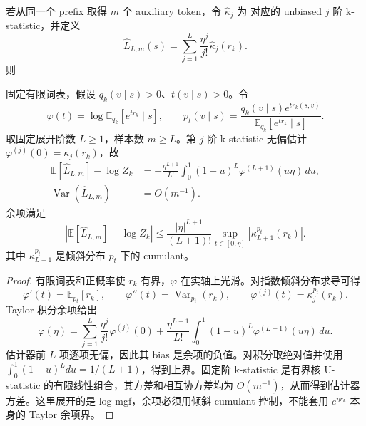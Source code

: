 若从同一个 prefix 取得 $m$ 个 auxiliary token，令 $\widehat\kappa_j$ 为 对应的 unbiased $j$ 阶 k-statistic，并定义
\begin{equation}
\widehat L_{L,m}(s)=\sum_{j=1}^{L}\frac{\eta^j}{j!}\widehat\kappa_j(r_k).
\label{eq:ch2-opd-logz-kstat-estimator}
\end{equation}
则
\begin{theorem}
\label{thm:ch2-opd-logz-cumulant}
固定有限词表，假设 $q_k(v\mid s)>0$、$t(v\mid s)>0$。令
\begin{equation}
\varphi(t)=\log\mathbb E_{q_k}[e^{t r_k}\mid s],\qquad
p_t(v\mid s)=\frac{q_k(v\mid s)e^{t r_k(s,v)}}{\mathbb E_{q_k}[e^{t r_k}\mid s]}.
\end{equation}
取固定展开阶数 $L\ge1$，样本数 $m\ge L$。第 $j$ 阶 k-statistic 无偏估计 $\varphi^{(j)}(0)=\kappa_j(r_k)$，故
\begin{align}
\mathbb E[\widehat L_{L,m}]-\log Z_k
&=-\frac{\eta^{L+1}}{L!}\int_0^1(1-u)^L\varphi^{(L+1)}(u\eta)\,du,\\
\operatorname{Var}(\widehat L_{L,m})&=O(m^{-1}).
\end{align}
余项满足
\begin{equation}
\left|\mathbb E[\widehat L_{L,m}]-\log Z_k\right|
\le\frac{|\eta|^{L+1}}{(L+1)!}\sup_{t\in[0,\eta]}\left|\kappa_{L+1}^{p_t}(r_k)\right|.
\end{equation}
其中 $\kappa_{L+1}^{p_t}$ 是倾斜分布 $p_t$ 下的 cumulant。
\end{theorem}
\begin{proof}
有限词表和正概率使 $r_k$ 有界，$\varphi$ 在实轴上光滑。对指数倾斜分布求导可得
\begin{equation}
\varphi'(t)=\mathbb E_{p_t}[r_k],\qquad
\varphi''(t)=\operatorname{Var}_{p_t}(r_k),\qquad
\varphi^{(j)}(t)=\kappa_j^{p_t}(r_k).
\end{equation}
Taylor 积分余项给出
\begin{equation}
\varphi(\eta)=\sum_{j=1}^{L}\frac{\eta^j}{j!}\varphi^{(j)}(0)
+\frac{\eta^{L+1}}{L!}\int_0^1(1-u)^L\varphi^{(L+1)}(u\eta)\,du.
\end{equation}
估计器前 $L$ 项逐项无偏，因此其 bias 是余项的负值。对积分取绝对值并使用 $\int_0^1(1-u)^Ldu=1/(L+1)$，得到上界。固定阶 k-statistic 是有界核 U-statistic 的有限线性组合，其方差和相互协方差均为 $O(m^{-1})$，从而得到估计器方差。这里展开的是 log-mgf，余项必须用倾斜 cumulant 控制，不能套用 $e^{\eta r_k}$ 本身的 Taylor 余项界。
\end{proof}

